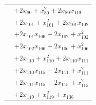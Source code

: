 \begin{longtable}{@{}r@{\;}l@{}}
 & \(\displaystyle +2x_{80} +x_{80}^{2} +2x_{80}x_{119}\) \\
 & \(\displaystyle +2x_{101} +x_{101}^{2} +2x_{101}x_{102}\) \\
 & \(\displaystyle +2x_{101}x_{106} +2x_{102} +x_{102}^{2}\) \\
 & \(\displaystyle +2x_{102}x_{106} +2x_{106} +x_{106}^{2}\) \\
 & \(\displaystyle +2x_{110} +x_{110}^{2} +2x_{110}x_{111}\) \\
 & \(\displaystyle +2x_{110}x_{115} +2x_{111} +x_{111}^{2}\) \\
 & \(\displaystyle +2x_{111}x_{115} +2x_{115} +x_{115}^{2}\) \\
 & \(\displaystyle +2x_{119} +x_{119}^{2} +x_{136}\) \\[3pt]
\end{longtable}
\endgroup
